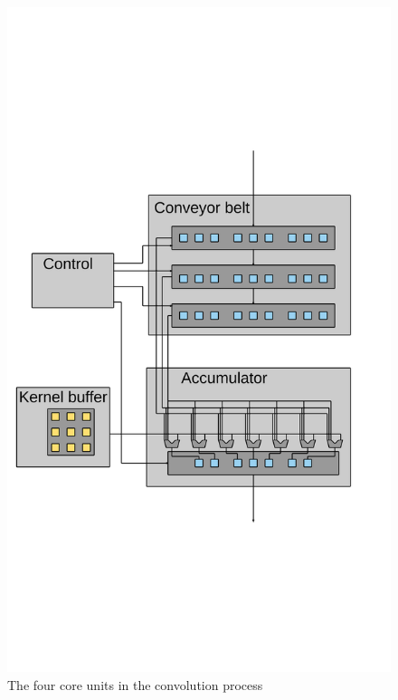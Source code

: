 \begin{figure}[h!]
    \includegraphics[width=\linewidth]{img/DaisyOverview.png}
    \caption{The four core units in the convolution process}
    \label{fig:DaisyView}
\end{figure}

